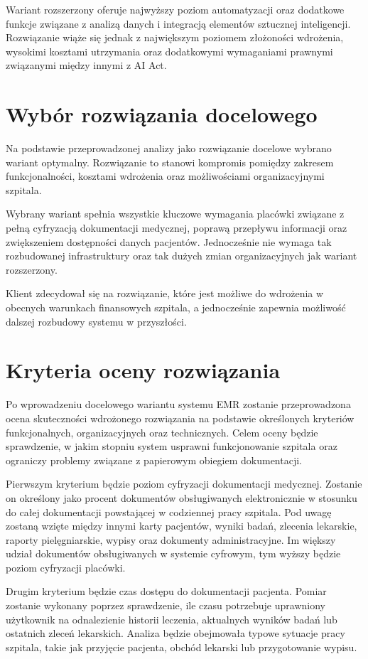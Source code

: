 Wariant rozszerzony oferuje najwyższy poziom automatyzacji oraz dodatkowe funkcje związane z analizą danych i integracją elementów sztucznej inteligencji. Rozwiązanie wiąże się jednak z największym poziomem złożoności wdrożenia, wysokimi kosztami utrzymania oraz dodatkowymi wymaganiami prawnymi związanymi między innymi z AI Act.

\section{Wybór rozwiązania docelowego}

Na podstawie przeprowadzonej analizy jako rozwiązanie docelowe wybrano wariant optymalny. Rozwiązanie to stanowi kompromis pomiędzy zakresem funkcjonalności, kosztami wdrożenia oraz możliwościami organizacyjnymi szpitala.

Wybrany wariant spełnia wszystkie kluczowe wymagania placówki związane z pełną cyfryzacją dokumentacji medycznej, poprawą przepływu informacji oraz zwiększeniem dostępności danych pacjentów. Jednocześnie nie wymaga tak rozbudowanej infrastruktury oraz tak dużych zmian organizacyjnych jak wariant rozszerzony.

Klient zdecydował się na rozwiązanie, które jest możliwe do wdrożenia w obecnych warunkach finansowych szpitala, a jednocześnie zapewnia możliwość dalszej rozbudowy systemu w przyszłości.
\section{Kryteria oceny rozwiązania}
Po wprowadzeniu docelowego wariantu systemu EMR zostanie przeprowadzona ocena skuteczności wdrożonego rozwiązania na podstawie określonych kryteriów funkcjonalnych, organizacyjnych oraz technicznych. Celem oceny będzie sprawdzenie, w jakim stopniu system usprawni funkcjonowanie szpitala oraz ograniczy problemy związane z papierowym obiegiem dokumentacji.

Pierwszym kryterium będzie poziom cyfryzacji dokumentacji medycznej. Zostanie on określony jako procent dokumentów obsługiwanych elektronicznie w stosunku do całej dokumentacji powstającej w codziennej pracy szpitala. Pod uwagę zostaną wzięte między innymi karty pacjentów, wyniki badań, zlecenia lekarskie, raporty pielęgniarskie, wypisy oraz dokumenty administracyjne. Im większy udział dokumentów obsługiwanych w systemie cyfrowym, tym wyższy będzie poziom cyfryzacji placówki.

Drugim kryterium będzie czas dostępu do dokumentacji pacjenta. Pomiar zostanie wykonany poprzez sprawdzenie, ile czasu potrzebuje uprawniony użytkownik na odnalezienie historii leczenia, aktualnych wyników badań lub ostatnich zleceń lekarskich. Analiza będzie obejmowała typowe sytuacje pracy szpitala, takie jak przyjęcie pacjenta, obchód lekarski lub przygotowanie wypisu.


